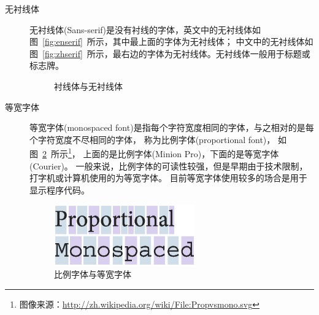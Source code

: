 \begin{description}
\item[无衬线体] 无衬线体(Sans-serif)是没有衬线的字体，英文中的无衬线体如图~\ref{fig:enserif}~所示，其中最上面的字体为无衬线体；
中文中的无衬线体如图~\ref{fig:zhserif}~所示，最右边的字体为无衬线体。无衬线体一般用于标题或标志牌。

\begin{figure}[!h]
\centering
{}
\hspace{0.1\textwidth}
\caption{衬线体与无衬线体}
\label{fig:serif}
\end{figure}

\item[等宽字体] 等宽字体(monospaced font)是指每个字符宽度相同的字体，与之相对的是每个字符宽度不尽相同的字体，
称为比例字体(proportional font)，
如图~\ref{fig:promono}~所示\footnote{图像来源：\url{http://zh.wikipedia.org/wiki/File:Propvsmono.svg}}，
上面的是比例字体(Minion Pro)，下面的是等宽字体(Courier)。
一般来说，比例字体的可读性较强，但是早期由于技术限制，打字机或计算机使用的为等宽字体。
目前等宽字体使用较多的场合是用于显示程序代码。

\begin{figure}[!h]
\centering
\includegraphics[width=0.6\textwidth]{figures/monospace.eps}
\caption{比例字体与等宽字体}
\label{fig:promono}
\end{figure}

\end{description}

